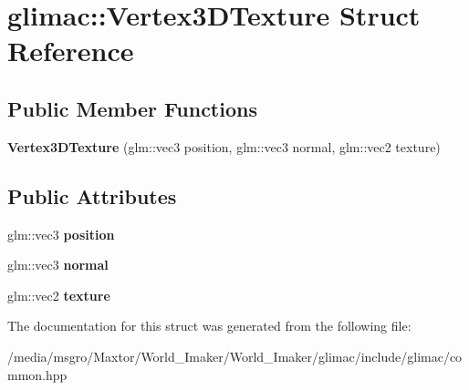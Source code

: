 \hypertarget{structglimac_1_1Vertex3DTexture}{}\section{glimac\+:\+:Vertex3\+D\+Texture Struct Reference}
\label{structglimac_1_1Vertex3DTexture}
\subsection*{Public Member Functions}
\begin{DoxyCompactItemize}
\item 
\mbox{\label{structglimac_1_1Vertex3DTexture_ac461f0825c04dd162e732cdcf61bce8b}} 
{\bfseries Vertex3\+D\+Texture} (glm\+::vec3 position, glm\+::vec3 normal, glm\+::vec2 texture)
\end{DoxyCompactItemize}
\subsection*{Public Attributes}
\begin{DoxyCompactItemize}
\item 
\mbox{\label{structglimac_1_1Vertex3DTexture_ac14c3d140276a6e99414c73c10f501b5}} 
glm\+::vec3 {\bfseries position}
\item 
\mbox{\label{structglimac_1_1Vertex3DTexture_af96395447e991b64d3871618b60b7e41}} 
glm\+::vec3 {\bfseries normal}
\item 
\mbox{\label{structglimac_1_1Vertex3DTexture_a7dc16eb566e2fb5cac456f001449faa0}} 
glm\+::vec2 {\bfseries texture}
\end{DoxyCompactItemize}


The documentation for this struct was generated from the following file\+:\begin{DoxyCompactItemize}
\item 
/media/msgro/\+Maxtor/\+World\+\_\+\+Imaker/\+World\+\_\+\+Imaker/glimac/include/glimac/common.\+hpp\end{DoxyCompactItemize}
